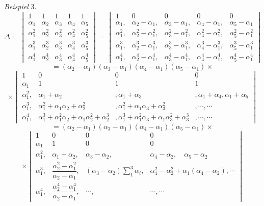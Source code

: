 \documentclass[11pt]{article}
\begin{document}
\textit{Beispiel} 3.
\[
\varDelta = \begin{vmatrix} 1 & 1 & 1 & 1 & 1\\ \alpha_1 & \alpha_2 & \alpha_3 & \alpha_4 & \alpha_5\\ \alpha_1^2 & \alpha_2^2 & \alpha_3^2 & \alpha_4^2 & \alpha_5^2\\ \alpha_1^3 & \alpha_2^3 & \alpha_3^3 & \alpha_4^3 & \alpha_5^3\\ \alpha_1^4 & \alpha_2^4 & \alpha_3^4 & \alpha_4^4 & \alpha_5^4\end{vmatrix}
= \begin{vmatrix}
1 & 0 & 0 & 0 & 0\\
\alpha_1, & \alpha_2-\alpha_1, & \alpha_3-\alpha_1, & \alpha_4-\alpha_1, & \alpha_5-\alpha_1\\
\alpha_1^2, & \alpha_2^2-\alpha_1^2, & \alpha_3^2-\alpha_1^2, & \alpha_4^2-\alpha_1^2, & \alpha_5^2-\alpha_1^2\\
\alpha_1^3, & \alpha_2^3-\alpha_1^3, & \alpha_3^3-\alpha_1^3, & \alpha_4^3-\alpha_1^3, & \alpha_5^3-\alpha_1^3\\
\alpha_1^4, & \alpha_2^4-\alpha_1^4, & \alpha_3^4-\alpha_1^4, & \alpha_4^4-\alpha_1^4, & \alpha_5^4-\alpha_1^4
\end{vmatrix}
\]
\[
= (\alpha_2-\alpha_1)(\alpha_3-\alpha_1)(\alpha_4-\alpha_1)(\alpha_5-\alpha_1) \times
\]
\[
\times \begin{vmatrix}
1 & 0 & 0 & 0\\
\alpha_1 & 1 & 1 & 1\\
\alpha_1^2, & \alpha_1+\alpha_2 & {}; \alpha_1+\alpha_3 & , \alpha_1+\alpha_4, \alpha_1+\alpha_5\\
\alpha_1^3, & \alpha_1^2+\alpha_1\alpha_2+\alpha_2^2 & , \alpha_1^2+\alpha_1\alpha_3+\alpha_3^2 & , \cdots, \cdots\\
\alpha_1^4, & \alpha_1^3+\alpha_1^2\alpha_2+\alpha_1\alpha_2^2+\alpha_2^3 & , \alpha_1^3+\alpha_1^2\alpha_3+\alpha_1\alpha_3^2+\alpha_3^3 & , \cdots, \cdots
\end{vmatrix}
\]
\[
= (\alpha_2-\alpha_1)(\alpha_3-\alpha_1)(\alpha_4-\alpha_1)(\alpha_5-\alpha_1) \times
\]
\[
\times \begin{vmatrix}
1 & 0 & 0 & 0\\
\alpha_1 & 1 & 0 & 0\\
\alpha_1^2, & \alpha_1+\alpha_2, & \alpha_3-\alpha_2, & \alpha_4-\alpha_2, \quad \alpha_5-\alpha_2\\
\alpha_1^3, & \dfrac{\alpha_2^2-\alpha_1^2}{\alpha_2-\alpha_1}, & (\alpha_3-\alpha_2)\displaystyle\sum_{1}^{3}\alpha_i, & \alpha_4^2-\alpha_2^2+\alpha_1(\alpha_4-\alpha_2), \cdots\\
\alpha_1^4, & \dfrac{\alpha_2^4-\alpha_1^4}{\alpha_2-\alpha_1}, & \cdots, & \cdots, \cdots
\end{vmatrix}
\]
\end{document}
